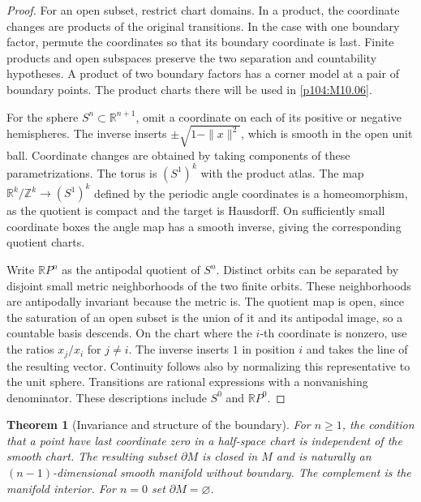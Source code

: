 \documentclass[11pt,oneside,openany]{book}
\newtheorem{theorem}{Theorem}[chapter]
\theoremstyle{definition}
\theoremstyle{remark}
\newcommand{\R}{\mathbb R}
\begin{document}
\begin{proof}
For an open subset, restrict chart domains. In a product, the
coordinate changes are products of the original transitions. In the
case with one boundary factor, permute the coordinates so that its
boundary coordinate is last. Finite products and open subspaces
preserve the two separation and countability hypotheses. A product of
two boundary factors has a corner model at a pair of boundary points.
The product charts there will be used in
\cref{p104:M10.06}.

For the sphere \(S^n\subset\R^{n+1}\), omit a coordinate on each of its
positive or negative hemispheres. The inverse inserts
\(\pm\sqrt{1-\|x\|^2}\), which is smooth in the open unit ball.
Coordinate changes are obtained by taking components of these
parametrizations. The torus is \((S^1)^k\) with the product atlas.
The map \(\R^k/\mathbb Z^k\to(S^1)^k\) defined by the periodic angle
coordinates is a homeomorphism, as the quotient is compact and the
target is Hausdorff. On sufficiently small coordinate boxes the angle
map has a smooth inverse, giving the corresponding quotient charts.

Write \(\R P^n\) as the antipodal quotient of \(S^n\). Distinct
orbits can be separated by disjoint small metric neighborhoods of the
two finite orbits. These neighborhoods are antipodally invariant
because the metric is. The quotient map is
open, since the saturation of an open subset is the union of it and
its antipodal image, so a countable basis descends. On the chart where
the \(i\)-th coordinate is nonzero, use the ratios \(x_j/x_i\) for
\(j\neq i\). The inverse inserts \(1\) in position \(i\) and takes
the line of the resulting vector. Continuity follows also by
normalizing this representative to the unit sphere. Transitions are
rational expressions with a nonvanishing denominator. These
descriptions include \(S^0\) and \(\R P^0\).
\end{proof}

\begin{theorem}[Invariance and structure of the boundary]\label{p104:M01.04}
For \(n\geq1\), the condition that a point have last coordinate zero in
a half-space chart is independent of the smooth chart. The resulting
subset \(\partial M\) is closed in \(M\) and is naturally an
\((n-1)\)-dimensional smooth manifold without boundary. The complement
is the manifold interior. For \(n=0\) set \(\partial M=\varnothing\).
\end{theorem}
\end{document}
